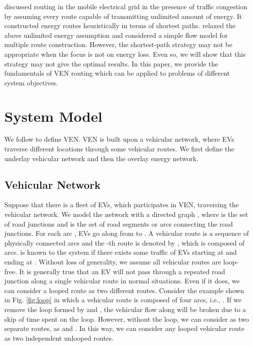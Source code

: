 \documentclass[journal]{IEEEtran}
\begin{document}
\cite{EVnetMASS} discussed routing in the mobile electrical grid in the presence of traffic congestion by assuming every route capable of transmitting unlimited amount of energy.
It constructed energy routes heuristically in terms of shortest paths. 
\cite{EVnetISGT2014} relaxed the above unlimited energy assumption and considered a simple flow model for multiple route construction.
However, the shortest-path strategy may not be appropriate when the focus is not on energy loss. Even so, we will show that this strategy may not give the optimal results. In this paper, we provide the fundamentals of VEN routing which can be applied to problems of different system objectives.  








\section{System Model} \label{sec:model}

We follow \cite{VEN} to define VEN. VEN is built upon a vehicular network, where EVs traverse different locations through some vehicular routes. We first define the underlay vehicular network and then the overlay energy network.

\subsection{Vehicular Network} 
Suppose that there is a fleet of EVs, which participates in VEN, traversing the vehicular network. We model the network with a directed graph , where  is the set of road junctions and  is the set of road segments or arcs connecting the road junctions. For each arc , EVs go along  from  to .
A vehicular route is a sequence of physically connected arcs and the -th route is denoted by , which is composed of  arcs.  is known to the system if there exists some traffic of EVs starting at  and ending at .
Without loss of generality, we assume all vehicular routes are loop-free. It is generally true that an EV will not pass through a repeated road junction along a single vehicular route in normal situations. Even if it does, we can consider a looped route as two different routes.
Consider the example shown in Fig. \ref{fig:loop} in which a vehicular route   is composed of four arcs, i.e., . If we remove the loop formed by  and , the vehicular flow along  will be broken due to a skip of time spent on the loop. However, without the loop, we can consider  as two separate routes, as  and . In this way, we can consider any looped vehicular route as two independent unlooped routes.
\end{document}
